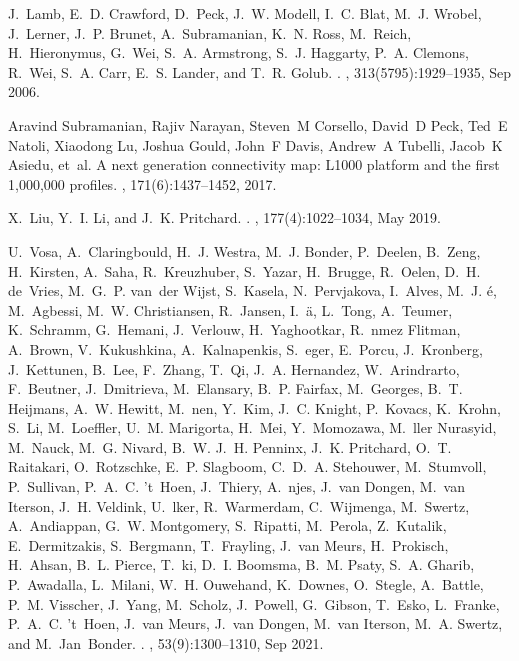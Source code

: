 \documentclass[
]{article}
\begin{document}
\begin{thebibliography}{100}
J.~Lamb, E.~D. Crawford, D.~Peck, J.~W. Modell, I.~C. Blat, M.~J. Wrobel,
  J.~Lerner, J.~P. Brunet, A.~Subramanian, K.~N. Ross, M.~Reich, H.~Hieronymus,
  G.~Wei, S.~A. Armstrong, S.~J. Haggarty, P.~A. Clemons, R.~Wei, S.~A. Carr,
  E.~S. Lander, and T.~R. Golub.
.
, 313(5795):1929--1935, Sep 2006.

Aravind Subramanian, Rajiv Narayan, Steven~M Corsello, David~D Peck, Ted~E
  Natoli, Xiaodong Lu, Joshua Gould, John~F Davis, Andrew~A Tubelli, Jacob~K
  Asiedu, et~al.
\newblock A next generation connectivity map: L1000 platform and the first
  1,000,000 profiles.
, 171(6):1437--1452, 2017.

X.~Liu, Y.~I. Li, and J.~K. Pritchard.
.
, 177(4):1022--1034, May 2019.

U.~Vosa, A.~Claringbould, H.~J. Westra, M.~J. Bonder, P.~Deelen, B.~Zeng,
  H.~Kirsten, A.~Saha, R.~Kreuzhuber, S.~Yazar, H.~Brugge, R.~Oelen, D.~H.
  de~Vries, M.~G.~P. van~der Wijst, S.~Kasela, N.~Pervjakova, I.~Alves, M.~J.
  {\'e}, M.~Agbessi, M.~W. Christiansen, R.~Jansen, I.~{\"a}, L.~Tong,
  A.~Teumer, K.~Schramm, G.~Hemani, J.~Verlouw, H.~Yaghootkar, R.~nmez Flitman,
  A.~Brown, V.~Kukushkina, A.~Kalnapenkis, S.~eger, E.~Porcu, J.~Kronberg,
  J.~Kettunen, B.~Lee, F.~Zhang, T.~Qi, J.~A. Hernandez, W.~Arindrarto,
  F.~Beutner, J.~Dmitrieva, M.~Elansary, B.~P. Fairfax, M.~Georges, B.~T.
  Heijmans, A.~W. Hewitt, M.~nen, Y.~Kim, J.~C. Knight, P.~Kovacs, K.~Krohn,
  S.~Li, M.~Loeffler, U.~M. Marigorta, H.~Mei, Y.~Momozawa, M.~ller Nurasyid,
  M.~Nauck, M.~G. Nivard, B.~W. J.~H. Penninx, J.~K. Pritchard, O.~T.
  Raitakari, O.~Rotzschke, E.~P. Slagboom, C.~D.~A. Stehouwer, M.~Stumvoll,
  P.~Sullivan, P.~A.~C. 't~Hoen, J.~Thiery, A.~njes, J.~van Dongen, M.~van
  Iterson, J.~H. Veldink, U.~lker, R.~Warmerdam, C.~Wijmenga, M.~Swertz,
  A.~Andiappan, G.~W. Montgomery, S.~Ripatti, M.~Perola, Z.~Kutalik,
  E.~Dermitzakis, S.~Bergmann, T.~Frayling, J.~van Meurs, H.~Prokisch,
  H.~Ahsan, B.~L. Pierce, T.~ki, D.~I. Boomsma, B.~M. Psaty, S.~A. Gharib,
  P.~Awadalla, L.~Milani, W.~H. Ouwehand, K.~Downes, O.~Stegle, A.~Battle,
  P.~M. Visscher, J.~Yang, M.~Scholz, J.~Powell, G.~Gibson, T.~Esko, L.~Franke,
  P.~A.~C. 't~Hoen, J.~van Meurs, J.~van Dongen, M.~van Iterson, M.~A. Swertz,
  and M.~Jan~Bonder.
.
, 53(9):1300--1310, Sep 2021.


\end{thebibliography}
\end{document}
